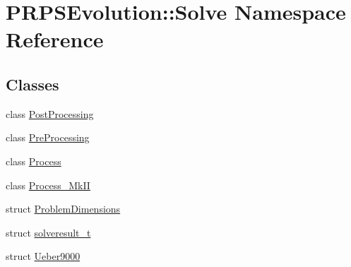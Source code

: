 \hypertarget{namespace_p_r_p_s_evolution_1_1_solve}{\section{\-P\-R\-P\-S\-Evolution\-:\-:\-Solve \-Namespace \-Reference}
\label{namespace_p_r_p_s_evolution_1_1_solve}
}
\subsection*{\-Classes}
\begin{DoxyCompactItemize}
\item 
class \hyperlink{class_p_r_p_s_evolution_1_1_solve_1_1_post_processing}{\-Post\-Processing}
\item 
class \hyperlink{class_p_r_p_s_evolution_1_1_solve_1_1_pre_processing}{\-Pre\-Processing}
\item 
class \hyperlink{class_p_r_p_s_evolution_1_1_solve_1_1_process}{\-Process}
\item 
class \hyperlink{class_p_r_p_s_evolution_1_1_solve_1_1_process___mk_i_i}{\-Process\-\_\-\-Mk\-I\-I}
\item 
struct \hyperlink{struct_p_r_p_s_evolution_1_1_solve_1_1_problem_dimensions}{\-Problem\-Dimensions}
\item 
struct \hyperlink{struct_p_r_p_s_evolution_1_1_solve_1_1solveresult__t}{solveresult\-\_\-t}
\item 
struct \hyperlink{struct_p_r_p_s_evolution_1_1_solve_1_1_ueber9000}{\-Ueber9000}
\end{DoxyCompactItemize}
